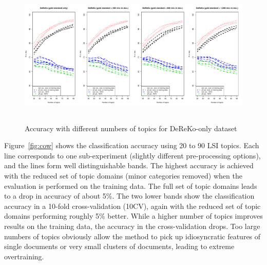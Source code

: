 \documentclass[11pt]{article}
\begin{document}
\begin{figure}[h]
  \centering
  \includegraphics[width=\textwidth, height=6.8cm]{graphics/dereko.pdf}
  \caption{Accuracy with different numbers of topics for DeReKo-only dataset}
  \label{fig:dereko}
\end{figure}

\begin{table}[h]
  \centering
  \caption{Evaluation at best achievable accuracy with the reduced set of topic domains in 10-fold cross-validation; Precision, Recall, and F-Measure are weighted averages across all categories}
  \label{tab:quality}
\end{table}

Figure~\ref{fig:cow} shows the classification accuracy using 20 to 90 LSI topics.
Each line corresponds to one sub-experiment (slightly different pre-processing options), and the lines form well distinguishable bands.
The highest accuracy is achieved with the reduced set of topic domains (minor categories removed) when the evaluation is performed on the training data.
The full set of topic domains leads to a drop in accuracy of about 5\%.
The two lower bands show the classification accuracy in a 10-fold cross-validation (10CV), again with the reduced set of topic domains performing roughly 5\% better.
While a higher number of topics improves results on the training data, the accuracy in the cross-validation drops.
Too large numbers of topics obviously allow the method to pick up idiosyncratic features of single documents or very small clusters of documents, leading to extreme overtraining.
\end{document}
